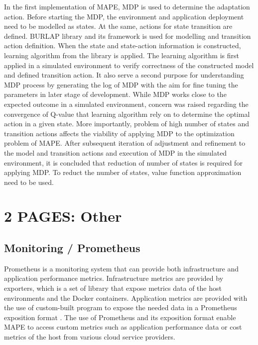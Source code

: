 \documentclass{seal_thesis}
\begin{document}
In the first implementation of MAPE, MDP is used to determine the adaptation action.
Before starting the MDP, the environment and application deployment need to be modelled as states. At the same, actions for state transition are defined.
BURLAP library and its framework is used for modelling and transition action definition.
When the state and state-action information is constructed, learning algorithm from the library is applied.
The learning algorithm is first applied in a simulated environment to verify correctness of the constructed model and defined transition action.
It also serve a second purpose for understanding MDP process by generating the log of MDP with the aim for fine tuning the parameters in later stage of development.
While MDP works close to the expected outcome in a simulated environment, concern was raised regarding the convergence of Q-value that learning algorithm rely on to determine the optimal action in a given state.
More importantly, problem of high number of states and transition actions affects the viability of applying MDP to the optimization problem of MAPE.
After subsequent iteration of adjustment and refinement to the model and transition actions and execution of MDP in the simulated environment, it is concluded that reduction of number of states is required for applying MDP.
To reduct the number of states, value function approximation need to be used.




\section{2 PAGES: Other}
\subsection{Monitoring / Prometheus}

Prometheus  is a monitoring system that can provide both infrastructure and application performance metrics.
Infrastructure metrics are provided by exporters, which is a set of library that expose metrics data of the host environments and the Docker containers.
Application metrics are provided with the use of custom-built program to expose the needed data in a Prometheus exposition format .
The use of Prometheus and its exposition format enable MAPE to access custom metrics such as application performance data or cost metrics of the host from various cloud service providers.
\end{document}
